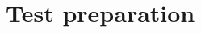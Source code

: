 \documentclass[Main]{subfiles}
\begin{document}
\setcounter{chapter}{2}
\chapter{Test preparation}
\end{document}
